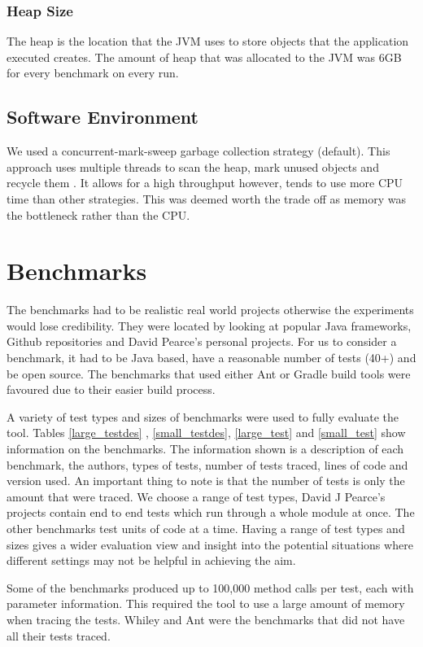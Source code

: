 \subsubsection{Heap Size}
The heap is the location that the JVM uses to store objects that the  application executed creates. The amount of heap that was allocated to the JVM was 6GB for every benchmark on every run.

\subsection{Software Environment}

We used a concurrent-mark-sweep garbage collection strategy (default). This approach uses multiple threads to scan the heap, mark unused objects and recycle them \cite{oracle2015}. It allows for a high throughput however, tends to use more CPU time than other strategies. This was deemed worth the trade off as memory was the bottleneck rather than the CPU.

\section{Benchmarks}
\label{S:bench}
The benchmarks had to be realistic real world projects otherwise the experiments would lose credibility. They were located by looking at popular Java frameworks, Github repositories and David Pearce's personal projects. For us to consider a benchmark, it had to be Java based, have a reasonable number of tests (40+) and be open source. The benchmarks that used either Ant or Gradle build tools were favoured due to their easier build process.

A variety of test types and sizes of benchmarks were used to fully evaluate the tool. Tables \ref{large_testdes} , \ref{small_testdes}, \ref{large_test} and \ref{small_test} show information on the benchmarks. The information shown is a description of each benchmark, the authors, types of tests, number of tests traced, lines of code and version used. An important thing to note is that the number of tests is only the amount that were traced. We choose a range of test types, David J Pearce's projects contain end to end tests which run through a whole module at once. The other benchmarks test units of code at a time. Having a range of test types and sizes gives a wider evaluation view and insight into the potential situations where different settings may not be helpful in achieving the aim.

Some of the benchmarks produced up to 100,000 method calls per test, each with parameter information. This required the tool to use a large amount of memory when tracing the tests. Whiley and Ant were the benchmarks that did not have all their tests traced. 

